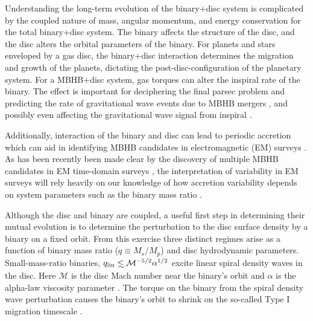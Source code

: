 \documentclass[usenatbib]{mnras}
\newcommand\lsim{\mathrel{\rlap{\lower4pt\hbox{\hskip1pt$\sim$}}
        \raise1pt\hbox{$<$}}}
\def\Mach{\mathcal{M}}
\begin{document}
Understanding the long-term evolution of the binary+disc system is
complicated by the coupled nature of mass, angular momentum, and energy
conservation for the total binary+disc system. The binary affects the
structure of the disc, and the disc alters the orbital parameters of
the binary. For planets and stars enveloped by a gas disc, the
binary+disc interaction determines the migration and growth of the
planets, dictating the post-disc-configuration of the planetary
system. For a MBHB+disc system, gas torques can alter the inspiral
rate of the binary. The effect is important for deciphering the final
parsec problem and predicting the rate of gravitational wave events
due to MBHB mergers \citep{Begel:Blan:Rees:1980, GouldRix:2000,
  ArmNat:2002:ApJL, ArmNat:2005}, and possibly even affecting the
gravitational wave signal from inspiral \citep[D'Orazio et al., {\em in preparation};][]{YKH:2011:L, KocsisYunesLoeb:2011}.

Additionally, interaction of the binary and disc can lead to periodic accretion \citep{Hayasaki:2007, MacFadyen:2008, Cuadra:2009, Roedig:2011:eccevo, Noble+2012,ShiKrolik:2012:ApJ, Roedig:2012:Trqs, DHM:2013:MNRAS, Farris:2014, Dunhill:2015, ShiKrolik:2015} which can aid in identifying MBHB candidates in electromagnetic (EM) surveys \citep{HKM09}. As has been recently been made clear by the discovery of multiple MBHB candidates in EM time-domain surveys \citep{Graham+2015a, Graham+2015b, Liu:7RsMBHB:2015}, the interpretation of variability in EM surveys will rely heavily on our knowledge of how accretion variability depends on system parameters such as the binary mass ratio \citep[see \textit{e.g.}][]{PG1302MNRAS:2015a,PG1302Nature:2015b}.                                                                                                                                                                                                                                                                                                                                                                                                                                                                                                                                                                                                                                 


Although the disc and binary are coupled, a useful first step in
determining their mutual evolution is to determine the perturbation to
the disc surface density by a binary on a fixed orbit. From this
exercise three distinct regimes arise as a function of binary mass 
ratio ($q \equiv M_s/M_p$) and disc hydrodynamic parameters. 
Small-mass-ratio binaries, $q_{\rm{lin}} \lsim \Mach^{-5/2}\alpha^{1/2}$
\citep{DuffellMac:2013:smallqGapOpen} excite linear spiral density
waves in the disc. Here $\Mach$ is the disc Mach number near the
binary's orbit and $\alpha$ is the alpha-law viscosity parameter
\citep{SS73}. The torque on the binary from the spiral density wave
perturbation causes the binary's orbit to shrink on the so-called Type
I migration timescale \citep{GT79, GT80, Ward:1997}.
\end{document}
